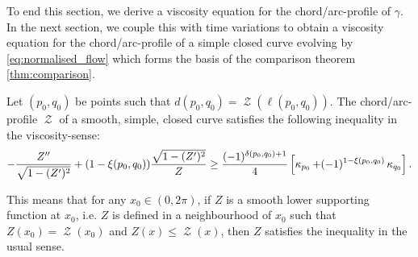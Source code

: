 \documentclass[11pt]{amsart}
\DeclareMathOperator{\chordarcprofile}{\mathcal{Z}}
\begin{document}
To end this section, we derive a viscosity equation for the chord/arc-profile of \(\gamma\). In the next section, we couple this with time variations to obtain a viscosity equation for the chord/arc-profile of a simple closed curve evolving by \ref{eq:normalised_flow} which forms the basis of the comparison theorem \ref{thm:comparison}. 

\begin{theorem}
\label{thm:spatial_viscosity}
Let $(p_0,q_0)$ be points such that $d(p_0, q_0) = \chordarcprofile(\ell(p_0, q_0))$. The chord/arc-profile $\chordarcprofile$ of a smooth, simple, closed curve satisfies the following inequality in the viscosity-sense:
\[
-\frac{Z''}{\sqrt{1-(Z')^2}} + (1-\xi(p_0,q_0)) \frac{\sqrt{1 - (Z')^2}}{Z} \geq \frac{(-1)^{\delta(p_0,q_0)+1}}{4} \left[\operatorname{\kappa}_{p_0} + (-1)^{1-\xi(p_0,q_0)} \operatorname{\kappa}_{q_0}\right].
\]
\end{theorem}

This means that for any \(x_0 \in (0,2\pi)\), if \(Z\) is a smooth lower supporting function at \(x_0\), i.e. \(Z\) is defined in a neighbourhood of \(x_0\) such that \(Z(x_0) = \chordarcprofile (x_0)\) and \(Z(x) \leq \chordarcprofile (x)\), then \(Z\) satisfies the inequality in the usual sense.
\end{document}
